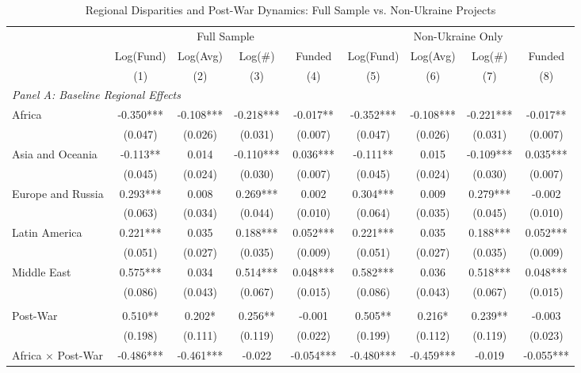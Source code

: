 \begin{table}[htbp]
\centering
\caption{Regional Disparities and Post-War Dynamics: Full Sample vs. Non-Ukraine Projects}
\label{tab:regional_war}
\begin{threeparttable}
\small
\begin{tabular}{lcccccccc}
\toprule
& \multicolumn{4}{c}{Full Sample} & \multicolumn{4}{c}{Non-Ukraine Only} \\
\cmidrule(lr){2-5} \cmidrule(lr){6-9}
& Log(Fund) & Log(Avg) & Log(\#) & Funded & Log(Fund) & Log(Avg) & Log(\#) & Funded \\
& (1) & (2) & (3) & (4) & (5) & (6) & (7) & (8) \\
\midrule
\multicolumn{9}{l}{\textit{Panel A: Baseline Regional Effects}} \\
Africa & -0.350*** & -0.108*** & -0.218*** & -0.017** & -0.352*** & -0.108*** & -0.221*** & -0.017** \\
& (0.047) & (0.026) & (0.031) & (0.007) & (0.047) & (0.026) & (0.031) & (0.007) \\
Asia and Oceania & -0.113** & 0.014 & -0.110*** & 0.036*** & -0.111** & 0.015 & -0.109*** & 0.035*** \\
& (0.045) & (0.024) & (0.030) & (0.007) & (0.045) & (0.024) & (0.030) & (0.007) \\
Europe and Russia & 0.293*** & 0.008 & 0.269*** & 0.002 & 0.304*** & 0.009 & 0.279*** & -0.002 \\
& (0.063) & (0.034) & (0.044) & (0.010) & (0.064) & (0.035) & (0.045) & (0.010) \\
Latin America & 0.221*** & 0.035 & 0.188*** & 0.052*** & 0.221*** & 0.035 & 0.188*** & 0.052*** \\
& (0.051) & (0.027) & (0.035) & (0.009) & (0.051) & (0.027) & (0.035) & (0.009) \\
Middle East & 0.575*** & 0.034 & 0.514*** & 0.048*** & 0.582*** & 0.036 & 0.518*** & 0.048*** \\
& (0.086) & (0.043) & (0.067) & (0.015) & (0.086) & (0.043) & (0.067) & (0.015) \\
\addlinespace
\multicolumn{9}{l}{\textit{Panel B: Post-War Interactions}} \\
Post-War & 0.510** & 0.202* & 0.256** & -0.001 & 0.505** & 0.216* & 0.239** & -0.003 \\
 & (0.198) & (0.111) & (0.119) & (0.022) & (0.199) & (0.112) & (0.119) & (0.023) \\
Africa $\times$ Post-War & -0.486*** & -0.461*** & -0.022 & -0.054*** & -0.480*** & -0.459*** & -0.019 & -0.055*** \\

\end{tabular}
\end{threeparttable}
\end{table}
